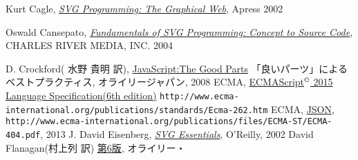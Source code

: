 \begin{thebibliography}{99}
 \iffalse
 \bibitem{WebGL}Andreas Anyuru(吉川 邦夫 訳),
\href{http://www.amazon.co.jp/%E5%AE%9F%E8%B7%B5%E3%83%97%E3%83%AD%E3%82%B0%E3%83%A9%E3%83%9F%E3%83%B3%E3%82%B0WebGL-HTML-JavaScript%E3%81%AB%E3%82%88%E3%82%8B3D%E3%82%B0%E3%83%A9%E3%83%95%E3%82%A3%E3%83%83%E3%82%AF%E3%82%B9%E9%96%8B%E7%99%BA-Programmer%E2%80%99s-SELECTION/dp/4798129534/ref=sr_1_1?ie=UTF8&qid=1365330500&sr=8-1&keywords=%E5%AE%9F%E8%B7%B5%E3%83%97%E3%83%AD%E3%82%B0%E3%83%A9%E3%83%9F%E3%83%B3%E3%82%B0WebGL}
{実践プログラミングWebGL HTML \& JavaScriptによる３Ｄグラフィック},
				 翔泳社, 2012年
				 \fi
\iffalse\else
{} Kurt Cagle, 
   \href{http://www.amazon.co.jp/exec/obidos/ASIN/1590590198/qid=1144561984/sr=1-4/ref=sr_1_10_4/249-1775097-0214759}
     {\it SVG Programming: The Graphical Web}, Apress 2002
\fi
  Oswald Cansepato, 
	\href{http://www.amazon.co.jp/exec/obidos/ASIN/1584502983/qid=1144561984/sr=1-1/ref=sr_1_10_1/249-1775097-0214759}
     {\it Fundamentals of SVG Programming: Concept to
	Source Code}, 
     CHARLES RIVER MEDIA, INC. 2004
         \iffalse
 \bibitem{Cox}David Cox, John Little, Donal O'Shea(落合、示野、西山、室、
	山本訳), グレブナ基底と代数多
	様体入門(上), シュプリンガー・フェアラーク東京 2000
         \fi
 D. Crockford( 水野 貴明 訳),
	 \href{http://www.amazon.co.jp/JavaScript%253a-Parts-%E2%80%95%E3%80%8C%E8%89%AF%E3%81%84%E3%83%91%E3%83%BC%E3%83%84%E3%80%8D%E3%81%AB%E3%82%88%E3%82%8B%E3%83%99%E3%82%B9%E3%83%88%E3%83%97%E3%83%A9%E3%82%AF%E3%83%86%E3%82%A3%E3%82%B9-Douglas-Crockford/dp/4873113911/ref=sr_1_1?ie=UTF8&qid=1304649181&sr=8-1}{JavaScript:The Good Parts}
         「良いパーツ」によるベストプラクティス, オライリージャパン, 2008
 ECMA, 
\href{http://www.ecma-international.org/publications/standards/Ecma-262.htm}
{ECMAScript$^\copyright$ 2015 Language Specification(6th edition)}\newline
\texttt{http://www.ecma-international.org/publications/standards/Ecma-262.htm}
ECMA,
\href{http://www.ecma-international.org/publications/files/ECMA-ST/ECMA-404.pdf}
				{JSON},
\texttt{http://www.ecma-international.org/publications/files/ECMA-ST/ECMA-404.pdf}, 2013
 J. David Eisenberg,
\href{http://www.amazon.co.jp/gp/product/0596002238/250-4160686-1026605?v=glance&n=1000}{\it
	 SVG Essentials}, O'Reilly, 2002
 David Flanagan(村上列 訳) 
\href{http://www.amazon.co.jp/JavaScript-第6版-David-Flanagan/dp/4873115736/ref=sr_1_1?ie=UTF8&qid=1353802698&sr=8-1}{\JS{} 第6版}, オライリー・

\end{thebibliography}
